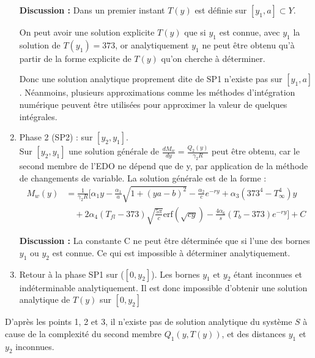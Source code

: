 \documentclass[12pt, oneside]{report} %
\theoremstyle{definition}
\theoremstyle{remark}
\begin{document}
\begin{enumerate}
\textbf{Discussion : } Dans un premier instant $T(y)$ est définie sur $\left[y_1, a\right] \subset Y$.\ 

On peut avoir une solution explicite $T(y)$ que si $y_1$ est connue, avec $y_1$ la solution de $T(y_1) = 373 $, or analytiquement $y_1$ ne peut être obtenu qu'à partir de la forme explicite de $T(y)$ qu'on cherche à déterminer. 

Donc une solution analytique proprement dite de SP1 n'existe pas sur $\left[y_1, a\right]$. Néanmoins, plusieurs approximations comme les méthodes d'intégration numérique peuvent être utilisées pour approximer la valeur de quelques intégrales.

\item Phase 2 (SP2) : sur $\left[y_2, y_1\right]$.\\
Sur $ \left[y_2, y_1 \right]$ une solution générale de $\frac{dM_w}{dy} = \frac{Q_2(y)}{\gamma_2 R}$ peut être obtenu, car le second membre de l'EDO ne dépend que de y, par application de la méthode de changements de variable.	La solution générale est de la forme : 
	\begin{align*}
		M_w(y) &= \frac{1}{\gamma_2 R} \Bigg[
		\alpha_1 y - \frac{\alpha_1}{a} \sqrt{1+(ya-b)^2} - \frac{\alpha_2}{c} e^{-ry}+ \alpha_3 (373^4 - T_\infty^4) y  \\
		&\quad + 2\alpha_4 (T_{fl}-373) \sqrt{\frac{5\pi }{c}} \text{erf}\left(\sqrt{cy}\right)  - \frac{4\alpha_6}{s} (T_b-373) e^{-ry}\Bigg] + C 				
	\end{align*}

		\textbf{Discussion : }
		La constante C ne peut être déterminée que si l'une des bornes $y_1$ ou $y_2$ est connue. Ce qui est impossible à déterminer analytiquement.

	\item Retour à la phase SP1 sur ($[0, y_2]$). 
	Les bornes $y_1\text{ et } y_2$ étant inconnues et indéterminable analytiquement. Il est donc impossible d'obtenir une solution analytique de $T(y)$ sur $[0, y_2]$ 
\end{enumerate}

D'après les points 1, 2 et 3, il n'existe pas de solution analytique du système $S$ à cause de la complexité du second membre $Q_1(y, T(y))$, et des distances $y_1$ et  $y_2$ inconnues.
\end{document}
